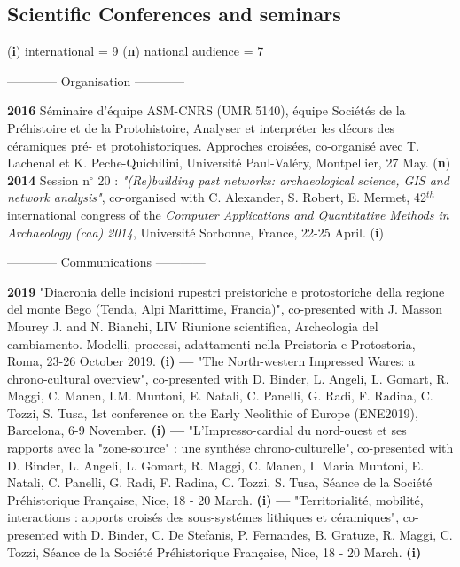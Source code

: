 \documentclass[11pt]{report} %
\begin{document}
\subsection*{Scientific Conferences and seminars }
\begin{center}(\textbf{i}) international = 9 {\textbar} (\textbf{n}) national audience = 7 \end{center}
\smallbreak
\begin{center}------------ Organisation ------------\end{center}
\smallbreak
\textbf{2016 }S\'{e}minaire d'\'{e}quipe ASM-CNRS (UMR 5140), \'{e}quipe Soci\'{e}t\'{e}s de la Pr\'{e}histoire et de la Protohistoire, Analyser et interpr\'{e}ter les d\'{e}cors des c\'{e}ramiques pr\'{e}- et protohistoriques. Approches crois\'{e}es, co-organis\'{e} avec T. Lachenal et K. Peche-Quichilini, Universit\'{e} Paul-Val\'{e}ry, Montpellier, 27 May. (\textbf{n})
\smallbreak
\textbf{2014 }Session n$\mathrm{{}^\circ}$ 20 :\textit{ "(Re)building past networks: archaeological science, GIS and network analysis"}, co-organised with C. Alexander, S. Robert, E. Mermet, 42${}^{th}$ international congress of the \textit{Computer Applications and Quantitative Methods in Archaeology (caa) 2014}, Universit\'{e} Sorbonne, France, 22-25 April. (\textbf{i})
\bigbreak
\begin{center}------------ Communications ------------\end{center}
\smallbreak
\textbf{2019 }"Diacronia delle incisioni rupestri preistoriche e protostoriche della regione del monte Bego (Tenda, Alpi Marittime, Francia)", co-presented with J. Masson Mourey J. and N. Bianchi, LIV Riunione scientifica, Archeologia del cambiamento. Modelli, processi, adattamenti nella Preistoria e Protostoria, Roma, 23-26 October 2019. \textbf{(i)}
\smallbreak
\textbf{---  }"The North-western Impressed Wares: a chrono-cultural overview", co-presented with D. Binder, L. Angeli, L. Gomart, R. Maggi, C. Manen, I.M. Muntoni, E. Natali, C. Panelli, G. Radi, F. Radina, C. Tozzi, S. Tusa, 1st conference on the Early Neolithic of Europe (ENE2019), Barcelona, 6-9 November. \textbf{(i)}
\smallbreak
\textbf{---  }"L'Impresso-cardial du nord-ouest et ses rapports avec la "zone-source" : une synth\'{e}se chrono-culturelle", co-presented with D. Binder, L. Angeli, L. Gomart, R. Maggi, C. Manen, I. Maria Muntoni, E. Natali, C. Panelli, G. Radi, F. Radina, C. Tozzi, S. Tusa, S\'{e}ance de la Soci\'{e}t\'{e} Pr\'{e}historique Fran\c{c}aise, Nice, 18 - 20 March.\textbf{ (i)}
\smallbreak
\textbf{---  }"Territorialit\'{e}, mobilit\'{e}, interactions : apports crois\'{e}s des sous-syst\'{e}mes lithiques et c\'{e}ramiques", co-presented with D. Binder, C. De Stefanis, P. Fernandes, B. Gratuze, R. Maggi, C. Tozzi, S\'{e}ance de la Soci\'{e}t\'{e} Pr\'{e}historique Fran\c{c}aise, Nice, 18 - 20 March.\textbf{ (i)}
\end{document}

